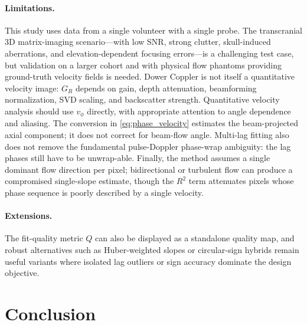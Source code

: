 \documentclass[11pt]{article}
\begin{document}
\paragraph{Limitations.}
This study uses data from a single volunteer with a single probe.  The
transcranial 3D matrix-imaging scenario---with low SNR, strong
clutter, skull-induced aberrations, and elevation-dependent focusing
errors---is a challenging test case, but validation on a larger cohort
and with physical flow phantoms providing ground-truth velocity fields
is needed.  Dower Coppler is not itself a quantitative velocity image:
$G_R$ depends on gain, depth attenuation, beamforming normalization,
SVD scaling, and backscatter strength.  Quantitative velocity analysis
should use $v_\phi$ directly, with appropriate attention to angle
dependence and aliasing.  The conversion in
\cref{eq:phase_velocity} estimates the beam-projected axial component;
it does not correct for beam-flow angle.  Multi-lag fitting also does
not remove the fundamental pulse-Doppler phase-wrap ambiguity: the lag
phases still have to be unwrap-able.  Finally, the method assumes a
single dominant flow direction per pixel; bidirectional or turbulent
flow can produce a compromised single-slope estimate, though the $R^2$
term attenuates pixels whose phase sequence is poorly described by a
single velocity.

\paragraph{Extensions.}
The fit-quality metric $Q$ can also be displayed as a standalone
quality map, and robust alternatives such as Huber-weighted slopes or
circular-sign hybrids remain useful variants where isolated lag
outliers or sign accuracy dominate the design objective.


\section{Conclusion}
\label{sec:conclusion}
\end{document}
